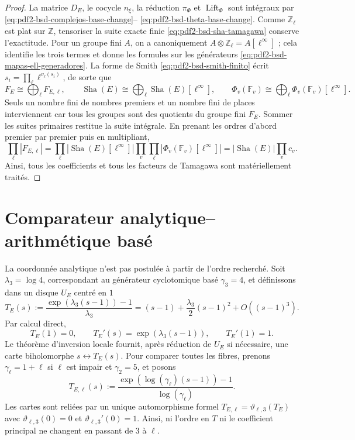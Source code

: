 \begin{proof}
La matrice $D_E$, le cocycle $n_\xi$, la réduction $\pi_\Phi$ et
$\operatorname{Lift}_\Phi$ sont intégraux par
\eqref{eq:pdf2-bsd-complejos-base-change}--
\eqref{eq:pdf2-bsd-theta-base-change}. Comme $\mathbb Z_\ell$ est plat sur
$\mathbb Z$, tensoriser la suite exacte finie
\eqref{eq:pdf2-bsd-sha-tamagawa} conserve l'exactitude. Pour un groupe fini
$A$, on a canoniquement
$A\otimes\mathbb Z_\ell=A[\ell^\infty]$ ; cela identifie les trois termes
et donne les formules sur les générateurs
\eqref{eq:pdf2-bsd-mapas-ell-generadores}. La forme de Smith
\eqref{eq:pdf2-bsd-smith-finito} écrit
$s_i=\prod_\ell\ell^{v_\ell(s_i)}$, de sorte que
\[
 F_E\cong\bigoplus_\ell F_{E,\ell},\qquad
 \operatorname{Sha}(E)\cong
   \bigoplus_\ell\operatorname{Sha}(E)[\ell^\infty],\qquad
 \Phi_v(\mathbb F_v)\cong
   \bigoplus_\ell\Phi_v(\mathbb F_v)[\ell^\infty].
\]
Seuls un nombre fini de nombres premiers et un nombre fini de places interviennent car tous les groupes
sont des quotients du groupe fini $F_E$. Sommer les suites primaires restitue
la suite intégrale. En prenant les ordres d'abord premier par premier puis en multipliant,
\begin{equation}\label{eq:pdf2-bsd-cardinal-sts-todos-ell}
 \prod_\ell|F_{E,\ell}|
 =\prod_\ell|\operatorname{Sha}(E)[\ell^\infty]|
   \prod_v\prod_\ell|\Phi_v(\mathbb F_v)[\ell^\infty]|
 =|\operatorname{Sha}(E)|\prod_vc_v.
\end{equation}
Ainsi, tous les coefficients et tous les
facteurs de Tamagawa sont matériellement traités.
\end{proof}

\section{Comparateur analytique--arithmétique basé}

La coordonnée analytique n'est pas postulée à partir de l'ordre recherché. Soit
$\lambda_3=\log4$, correspondant au générateur cyclotomique basé
$\gamma_3=4$, et définissons dans un disque $U_E$ centré en $1$
\begin{equation}\label{eq:pdf2-bsd-t-e-construido}
 T_E(s):=\frac{\exp(\lambda_3(s-1))-1}{\lambda_3}
 =(s-1)+\frac{\lambda_3}{2}(s-1)^2+O((s-1)^3).
\end{equation}
Par calcul direct,
\begin{equation}\label{eq:pdf2-bsd-t-e-normalizacion-probada}
 T_E(1)=0,
 \qquad T_E'(s)=\exp(\lambda_3(s-1)),
 \qquad T_E'(1)=1.
\end{equation}
Le théorème d'inversion locale fournit, après réduction de $U_E$ si
nécessaire, une carte biholomorphe $s\leftrightarrow T_E(s)$.
Pour comparer toutes les fibres, prenons
$\gamma_\ell=1+\ell$ si $\ell$ est impair et $\gamma_2=5$, et posons
\begin{equation}\label{eq:pdf2-bsd-t-ell-construido}
 T_{E,\ell}(s):=
 \frac{\exp(\log(\gamma_\ell)(s-1))-1}{\log(\gamma_\ell)}.
\end{equation}
Les cartes sont reliées par un unique automorphisme formel
$T_{E,\ell}=\vartheta_{\ell,3}(T_E)$ avec
$\vartheta_{\ell,3}(0)=0$ et $\vartheta_{\ell,3}'(0)=1$. Ainsi, ni
l'ordre en $T$ ni le coefficient principal ne changent en passant de $3$ à $\ell$.

